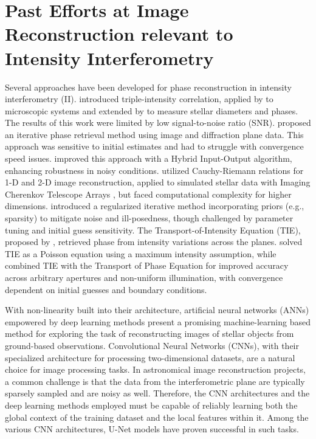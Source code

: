 \section{Past Efforts at Image Reconstruction relevant to Intensity Interferometry}
Several approaches have been developed for phase reconstruction in intensity interferometry (II). \cite{gamo1963triple} introduced triple-intensity correlation, applied by \cite{goldberger1963use} to microscopic systems and extended by \cite{sato1978imaging, sato1979computer, sato1981adaptive} to measure stellar diameters and phases. The results of this work were limited by low signal-to-noise ratio (SNR). \cite{GerchbergSaxton1972} proposed an iterative phase retrieval method using image and diffraction plane data. This approach was sensitive to initial estimates and had  to struggle with convergence speed issues. \cite{Fienup1982} improved this approach with a Hybrid Input-Output algorithm, enhancing robustness in noisy conditions. \cite{holmes2010two} utilized Cauchy-Riemann relations for 1-D and 2-D image reconstruction, applied to simulated stellar data with Imaging Cherenkov Telescope Arrays \citep{nunez2010stellar, nunez2012high, nunez2012imaging}, but faced computational complexity for higher dimensions. \cite{Li2014} introduced a regularized iterative method incorporating priors (e.g., sparsity) to mitigate noise and ill-posedness, though challenged by parameter tuning and initial guess sensitivity. The Transport-of-Intensity Equation (TIE), proposed by \cite{Teague1983}, retrieved phase from intensity variations across the planes. \cite{Zhang2020} solved TIE as a Poisson equation using a maximum intensity assumption, while \cite{Kirisits2024} combined TIE with the Transport of Phase Equation for improved accuracy across arbitrary apertures and non-uniform illumination, with convergence dependent on initial guesses and boundary conditions.

With non-linearity built into their architecture, artificial neural networks (ANNs) empowered by deep learning methods  present a promising machine-learning based method for exploring the task of reconstructing images of stellar objects from ground-based observations. Convolutional Neural Networks (CNNs), with their specialized architecture for processing two-dimensional datasets, are a natural choice for image processing tasks. In astronomical image reconstruction projects, a common challenge is that the data from the interferometric plane are typically sparsely sampled and are noisy as well. Therefore, the CNN architectures and the deep learning methods employed must be capable of reliably learning both the global context of the training dataset and the local features within it. Among the various CNN architectures, U-Net models \citep{ronneberger2015u} have proven successful in such tasks.

